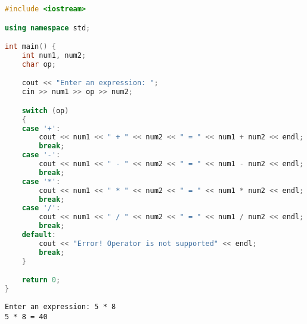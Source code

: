 \begin{lstlisting}[language=C++]
#include <iostream>

using namespace std;

int main() {
	int num1, num2;
	char op;

	cout << "Enter an expression: ";
	cin >> num1 >> op >> num2;

	switch (op)
	{
	case '+':
		cout << num1 << " + " << num2 << " = " << num1 + num2 << endl;
		break;
	case '-':
		cout << num1 << " - " << num2 << " = " << num1 - num2 << endl;
		break;
	case '*':
		cout << num1 << " * " << num2 << " = " << num1 * num2 << endl;
		break;
	case '/':
		cout << num1 << " / " << num2 << " = " << num1 / num2 << endl;
		break;
	default:
		cout << "Error! Operator is not supported" << endl;
		break;
	}

	return 0;
}
\end{lstlisting}

\begin{tcolorbox}
	\begin{verbatim}
Enter an expression: 5 * 8
5 * 8 = 40
\end{verbatim}
\end{tcolorbox}

\newpage